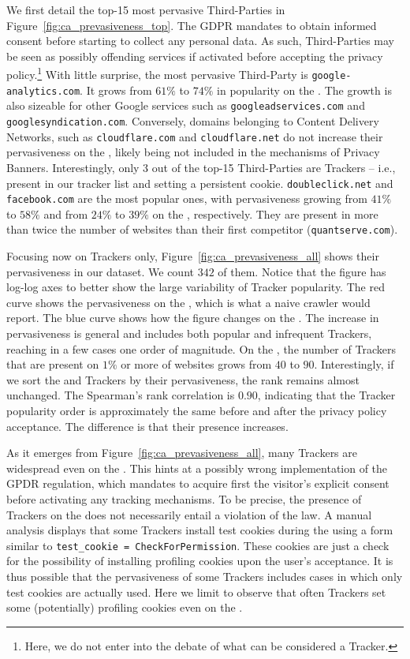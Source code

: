 We first detail the top-15 most pervasive Third-Parties in Figure~\ref{fig:ca_prevasiveness_top}. The GDPR mandates to obtain informed consent before starting to collect any personal data. As such, Third-Parties may be seen as possibly offending services if activated before accepting the privacy policy.\footnote{Here, we do not enter into the debate of what can be considered a Tracker.} With little surprise, the most pervasive Third-Party is \texttt{google-analytics.com}. It grows from $61\%$ to $74\%$ in popularity on the \AFTER. The growth is also sizeable for other Google services such as \texttt{googleadservices.com} and \texttt{googlesyndication.com}. Conversely, domains belonging to Content Delivery Networks, such as \texttt{cloudflare.com} and \texttt{cloudflare.net} do not increase their pervasiveness on the \AFTER, likely being not included in the mechanisms of Privacy Banners. Interestingly, only 3 out of the top-15 Third-Parties are Trackers -- i.e., present in our tracker list and setting a persistent cookie. \texttt{doubleclick.net} and \texttt{facebook.com} are the most popular ones, with pervasiveness growing from $41\%$ to $58\%$ and from $24\%$ to $39\%$ on the \AFTER, respectively. They are present in more than twice the number of websites than their first competitor (\texttt{quantserve.com}).

Focusing now on Trackers only, Figure~\ref{fig:ca_prevasiveness_all} shows their pervasiveness in our dataset. We count $342$ of them. Notice that the figure has log-log axes to better show the large variability of Tracker popularity. The red curve shows the pervasiveness on the \BEFORE, which is what a naive crawler would report. The blue curve shows how the figure changes on the \AFTER. The increase in pervasiveness is general and includes both popular and infrequent Trackers, reaching in a few cases one order of magnitude. On the \AFTER, the number of Trackers that are present on $1\%$ or more of websites grows from $40$ to $90$. Interestingly, if we sort the \BEFORE and \AFTER Trackers by their pervasiveness, the rank remains almost unchanged. The Spearman's rank correlation is $0.90$, indicating that the Tracker popularity order is approximately the same before and after the privacy policy acceptance. The difference is that their presence increases.

As it emerges from Figure~\ref{fig:ca_prevasiveness_all}, many Trackers are widespread even on the \BEFORE. This hints at a possibly wrong implementation of the GPDR regulation, which mandates to acquire first the visitor's explicit consent before activating any tracking mechanisms. To be precise, the presence of Trackers on the \BEFORE does not necessarily entail a violation of the law. A manual analysis displays that some Trackers install test cookies during the \BEFORE using a form similar to \texttt{test\_cookie = CheckForPermission}. These cookies are just a check for the possibility of installing profiling cookies upon the user's acceptance. It is thus possible that the \BEFORE pervasiveness of some Trackers includes cases in which only test cookies are actually used. Here we limit to observe that often Trackers set some (potentially) profiling cookies even on the \BEFORE.

